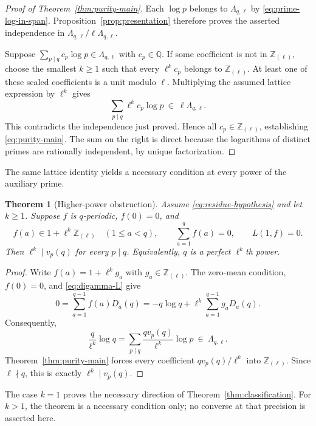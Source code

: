 \documentclass[11pt,a4paper]{article}
\newtheorem{theorem}{Theorem}[section]
\theoremstyle{definition}
\theoremstyle{remark}
\newcommand{\Q}{\mathbb Q}
\newcommand{\Z}{\mathbb Z}
\newcommand{\Zloc}{\Z_{(\ell)}}
\begin{document}
\begin{proof}[Proof of Theorem~\ref{thm:purity-main}]
Each $\log p$ belongs to $\Lambda_{q,\ell}$ by
\eqref{eq:prime-log-in-span}. Proposition~\ref{prop:presentation}
therefore proves the asserted independence in
$\Lambda_{q,\ell}/\ell\Lambda_{q,\ell}$.

Suppose $\sum_{p\mid q}c_p\log p\in\Lambda_{q,\ell}$ with
$c_p\in\Q$. If some coefficient is not in $\Zloc$, choose the
smallest $k\ge1$ such that every $\ell^kc_p$ belongs to $\Zloc$.
At least one of these scaled coefficients is a unit modulo $\ell$.
Multiplying the assumed lattice expression by $\ell^k$ gives
\[
 \sum_{p\mid q}\ell^kc_p\log p
 \ \in\ \ell\Lambda_{q,\ell}.
\]
This contradicts the independence just proved. Hence all
$c_p\in\Zloc$, establishing \eqref{eq:purity-main}. The sum on the
right is direct because the logarithms of distinct primes are
rationally independent, by unique factorization.
\end{proof}

The same lattice identity yields a necessary condition at every power
of the auxiliary prime.

\begin{theorem}[Higher-power obstruction]\label{thm:higher-power}
Assume \eqref{eq:residue-hypothesis} and let $k\ge1$. Suppose $f$ is
$q$-periodic, $f(0)=0$, and
\[
 f(a)\in1+\ell^k\Zloc\quad(1\le a<q),\qquad
 \sum_{a=1}^{q}f(a)=0,\qquad L(1,f)=0.
\]
Then $\ell^k\mid v_p(q)$ for every $p\mid q$. Equivalently, $q$
is a perfect $\ell^k$th power.
\end{theorem}

\begin{proof}
Write $f(a)=1+\ell^kg_a$ with $g_a\in\Zloc$. The zero-mean condition,
$f(0)=0$, and \eqref{eq:digamma-L} give
\[
 0=\sum_{a=1}^{q-1}f(a)D_a(q)
   =-q\log q+\ell^k\sum_{a=1}^{q-1}g_aD_a(q).
\]
Consequently,
\begin{equation}\label{eq:logq-in-lattice}
 \frac q{\ell^k}\log q
 =\sum_{p\mid q}\frac{qv_p(q)}{\ell^k}\log p
 \ \in\ \Lambda_{q,\ell}.
\end{equation}
Theorem~\ref{thm:purity-main} forces every coefficient
$qv_p(q)/\ell^k$ into $\Zloc$. Since $\ell\nmid q$, this is exactly
$\ell^k\mid v_p(q)$.
\end{proof}

The case $k=1$ proves the necessary direction of
Theorem~\ref{thm:classification}. For $k>1$, the theorem is a necessary
condition only; no converse at that precision is asserted here.
\end{document}
